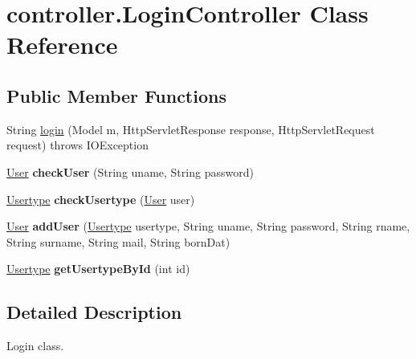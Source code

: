 \hypertarget{classcontroller_1_1_login_controller}{}\section{controller.\+Login\+Controller Class Reference}
\label{classcontroller_1_1_login_controller}
\subsection*{Public Member Functions}
\begin{DoxyCompactItemize}
\item 
String \mbox{\hyperlink{classcontroller_1_1_login_controller_a9fd62e375ad30b0553200ad40d859cbc}{login}} (Model m, Http\+Servlet\+Response response, Http\+Servlet\+Request request)  throws I\+O\+Exception 
\item 
\mbox{\label{classcontroller_1_1_login_controller_a8d8cdcfd7a22080b7c97087a662802bb}} 
\mbox{\hyperlink{classentity_1_1_user}{User}} {\bfseries check\+User} (String uname, String password)
\item 
\mbox{\label{classcontroller_1_1_login_controller_ada6f6ceca4def5442683619cb669a34e}} 
\mbox{\hyperlink{classentity_1_1_usertype}{Usertype}} {\bfseries check\+Usertype} (\mbox{\hyperlink{classentity_1_1_user}{User}} user)
\item 
\mbox{\label{classcontroller_1_1_login_controller_a42297a84ac9029ac0d92530a62fa868b}} 
\mbox{\hyperlink{classentity_1_1_user}{User}} {\bfseries add\+User} (\mbox{\hyperlink{classentity_1_1_usertype}{Usertype}} usertype, String uname, String password, String rname, String surname, String mail, String born\+Dat)
\item 
\mbox{\label{classcontroller_1_1_login_controller_a9c5c1c0ad9dfebe970d224e40cc096f9}} 
\mbox{\hyperlink{classentity_1_1_usertype}{Usertype}} {\bfseries get\+Usertype\+By\+Id} (int id)
\end{DoxyCompactItemize}


\subsection{Detailed Description}
Login class.

